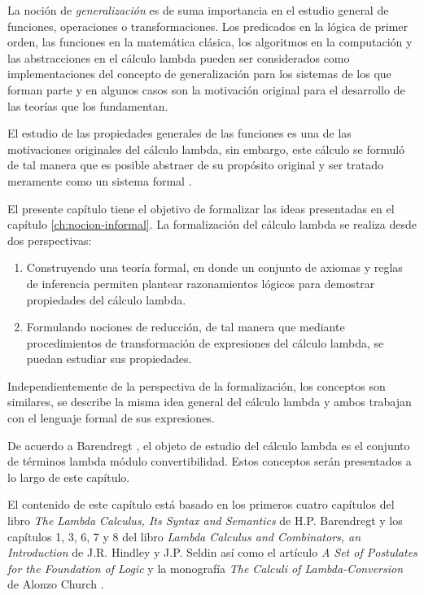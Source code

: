 La noción de \emph{generalización} es de suma importancia en el estudio general de funciones, operaciones o transformaciones. Los predicados en la lógica de primer orden, las funciones en la matemática clásica, los algoritmos en la computación y las abstracciones en el cálculo lambda pueden ser considerados como implementaciones del concepto de generalización para los sistemas de los que forman parte y en algunos casos son la motivación original para el desarrollo de las teorías que los fundamentan.

El estudio de las propiedades generales de las funciones es una de las motivaciones originales del cálculo lambda, sin embargo, este cálculo se formuló de tal manera que es posible abstraer de su propósito original y ser tratado meramente como un sistema formal \cite{Church:LambdaConversion}.

El presente capítulo tiene el objetivo de formalizar las ideas presentadas en el capítulo \ref{ch:nocion-informal}. La formalización del cálculo lambda se realiza desde dos perspectivas:

\begin{enumerate}
\item Construyendo una teoría formal, en donde un conjunto de axiomas y reglas de inferencia permiten plantear razonamientos lógicos para demostrar propiedades del cálculo lambda.
\item Formulando nociones de reducción, de tal manera que mediante procedimientos de transformación de expresiones del cálculo lambda, se puedan estudiar sus propiedades.
\end{enumerate}

Independientemente de la perspectiva de la formalización, los conceptos son similares, se describe la misma idea general del cálculo lambda y ambos trabajan con el lenguaje formal de sus expresiones.

De acuerdo a Barendregt \cite[p.~22]{Barendregt:Bible}, el objeto de estudio del cálculo lambda es el conjunto de términos lambda módulo convertibilidad. Estos conceptos serán presentados a lo largo de este capítulo.

El contenido de este capítulo está basado en los primeros cuatro capítulos del libro \emph{The Lambda Calculus, Its Syntax and Semantics} de H.P. Barendregt \cite{Barendregt:Bible} y los capítulos 1, 3, 6, 7 y 8 del libro \emph{Lambda Calculus and Combinators, an Introduction} de J.R. Hindley y J.P. Seldin \cite{HindleySeldin:LambdaCalculusAndCombinators} así como el artículo \emph{A Set of Postulates for the Foundation of Logic} y la monografía \emph{The Calculi of Lambda-Conversion} de Alonzo Church \cite{Church:FoundationsLogic,Church:LambdaConversion}.

